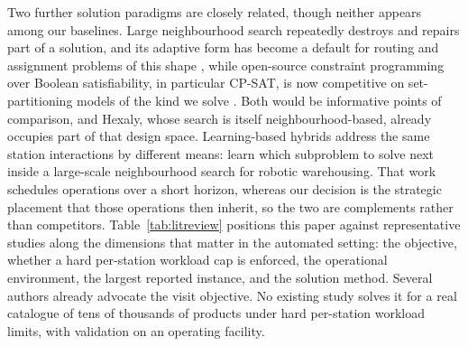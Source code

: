 \documentclass[]{interact}
\begin{document}
Two further solution paradigms are closely related, though neither appears among our baselines. Large neighbourhood search repeatedly destroys and repairs part of a solution, and its adaptive form has become a default for routing and assignment problems of this shape \citep{ropke2006alns, pisinger2010lns}, while open-source constraint programming over Boolean satisfiability, in particular CP-SAT, is now competitive on set-partitioning models of the kind we solve \citep{perron2023cpsat}. Both would be informative points of comparison, and Hexaly, whose search is itself neighbourhood-based, already occupies part of that design space. Learning-based hybrids address the same station interactions by different means: \citet{barnhart2024learnthenoptimize} learn which subproblem to solve next inside a large-scale neighbourhood search for robotic warehousing. That work schedules operations over a short horizon, whereas our decision is the strategic placement that those operations then inherit, so the two are complements rather than competitors. Table~\ref{tab:litreview} positions this paper against representative studies along the dimensions that matter in the automated setting: the objective, whether a hard per-station workload cap is enforced, the operational environment, the largest reported instance, and the solution method. Several authors already advocate the visit objective. No existing study solves it for a real catalogue of tens of thousands of products under hard per-station workload limits, with validation on an operating facility.
\end{document}
